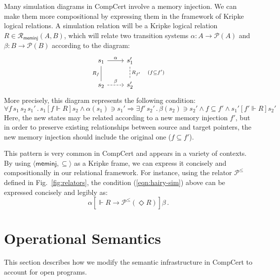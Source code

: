\documentclass[sigplan,10pt,review,anonymous]{acmart}
\newcommand{\kw}[1]{\ensuremath{ \mathsf{#1} }}
\newcommand{\ifr}[1]{\mathrel{[{#1}]}}
\begin{document}
\begin{example} \label{ex:sim} %
Many simulation diagrams in CompCert
involve a memory injection.
We can make them more compositional by
expressing them in the framework of Kripke logical relations.
A simulation relation will be a Kripke logical relation
$R \in \mathcal{R}_\kw{meminj}(A, B)$,
which will relate two transition systems
$\alpha : A \rightarrow \mathcal{P}(A)$ and
$\beta : B \rightarrow \mathcal{P}(B)$
according to the diagram:
\[
  \begin{tikzcd}
    s_1 \arrow[r, "\alpha"]
        \arrow[d, dash, "R_f"'] &
    s_1' \arrow[d, dashed, dash, "R_{f'} \quad (f \subseteq f')"] \\
    s_2 \arrow[r, dashed, "\beta"] &
    s_2'
  \end{tikzcd}
\]
More precisely, this diagram represents the following condition:
\begin{equation}
    \label{eqn:hairy-sim}
    \forall f \, s_1 \, s_2 \, s_1' \,.\,
      s_1 \ifr{f \Vdash R} s_2 \wedge
      \alpha(s_1) \ni s_1' \Rightarrow
    \exists f' \, s_2' \,.\,
      \beta(s_2) \ni s_2' \wedge
      f \subseteq f' \wedge
      s_1' \ifr{f' \Vdash R} s_2'
\end{equation}
Here, the new states may be related according to
a new memory injection $f'$,
but in order to preserve existing relationships
between source and target pointers,
the new memory injection should include
the original one ($f \subseteq f'$).

This pattern is very common in CompCert
and appears in a variety of contexts.
By using $\langle \kw{meminj}, {\subseteq} \rangle$
as a Kripke frame,
we can express it concisely and compositionally
in our relational framework.
For instance,
using the relator $\mathcal{P}^\le$ defined in
Fig.~\ref{fig:relators},
the condition (\ref{eqn:hairy-sim}) above can be expressed
concisely and legibly as:
\[
  \alpha \ifr{\Vdash R \rightarrow \mathcal{P}^\le(\Diamond R)} \beta \,.
\]
\end{example}



\newpage
\section{Operational Semantics} \label{sec:compcert} %

This section describes how we modify
the semantic infrastructure in CompCert
to account for open programs.
\end{document}
